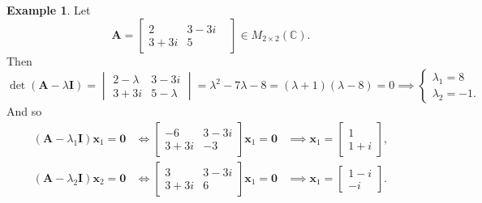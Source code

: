 \documentclass[12pt,openany]{book}
\theoremstyle{definition}
\newtheorem{example}{Example}[chapter]
\newcommand{\C}{\mathbb{C}}
\newcommand{\by}{\times}
\begin{document}
	\begin{example}
		Let \[
		\textbf{A}=\begin{bmatrix}
			2&3-3i&\\3+3i&5
		\end{bmatrix}\in M_{2\by 2}(\C).
		\] Then \[
		\det(\textbf{A}-\lambda\textbf{I})=\begin{vmatrix}
			2-\lambda&3-3i\\3+3i&5-\lambda
		\end{vmatrix}=\lambda^2-7\lambda-8=(\lambda+1)(\lambda-8)=0\implies\begin{cases}
		\lambda_1=8\\ \lambda_2=-1.
	\end{cases}
		\] And so \begin{align*}
			(\textbf{A}-\lambda_1\textbf{I})\textbf{x}_1=\textbf{0}&\iff\begin{bmatrix}
				-6&3-3i\\3+3i&-3
			\end{bmatrix}\textbf{x}_1=\textbf{0}&\implies\textbf{x}_1=\begin{bmatrix}
				1\\1+i
			\end{bmatrix},\\
			(\textbf{A}-\lambda_2\textbf{I})\textbf{x}_2=\textbf{0}&\iff\begin{bmatrix}
				3&3-3i\\3+3i&6
			\end{bmatrix}\textbf{x}_1=\textbf{0}&\implies\textbf{x}_1=\begin{bmatrix}
				1-i\\-i
			\end{bmatrix}.
		\end{align*}
	\end{example}
\end{document}
